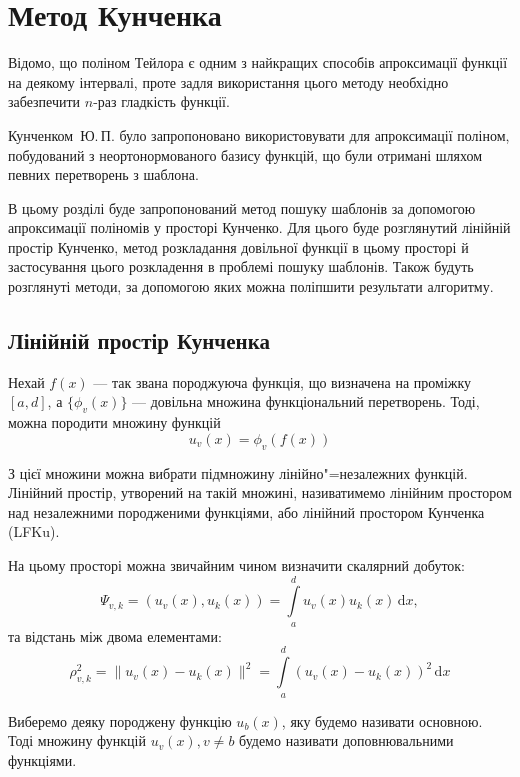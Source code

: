 \chapter{Метод Кунченка}
\label{chap:selected}

Відомо, що поліном Тейлора є одним з найкращих способів апроксимації функції на деякому інтервалі, проте задля
використання цього методу необхідно забезпечити $n$-раз гладкість функції.

Кунченком~Ю.\,П. було запропоновано використовувати для апроксимації поліном, побудований з неортонормованого базису
функцій, що були отримані шляхом певних перетворень з шаблона.

В цьому розділі буде запропонований метод пошуку шаблонів за допомогою апроксимації поліномів у просторі Кунченко.
Для цього буде розглянутий лінійній простір Кунченко, метод розкладання довільної функції в цьому просторі й
застосування цього розкладення в проблемі пошуку шаблонів.
Також будуть розглянуті методи, за допомогою яких можна поліпшити результати алгоритму.

\section{Лінійній простір Кунченка}
    Нехай $f(x)$ --- так звана породжуюча функція, що визначена на проміжку ${[a, d]}$, а $\{ \phi_v( x ) \}$ ---
    довільна множина функціональний перетворень.
    Тоді, можна породити множину функцій
    \begin{equation}
        u_v(x) = \phi_v( f( x ))
    \end{equation}

    З цієї множини можна вибрати підмножину лінійно"=незалежних функцій.
    Лінійний простір, утворений на такій множині, називатимемо лінійним простором над незалежними породженими
    функціями, або лінійний простором Кунченка (LFKu).

    На цьому просторі можна звичайним чином визначити скалярний добуток:
    \begin{equation}
        \Psi_{v,k} = (u_v( x ), u_k( x ) ) = \int\limits_a^d u_v( x ) u_k( x )\,\mathrm{d}x,
    \end{equation}
    та відстань між двома елементами:
    \begin{equation}
        \rho_{v,k}^2 = \|u_v( x ) - u_k( x )\|^2 = \int\limits_a^d\left(u_v(x) - u_k(x)\right)^2\,\mathrm{d}x
    \end{equation}

    Виберемо деяку породжену функцію $u_b(x)$, яку будемо називати основною.
    Тоді множину функцій $u_v(x), v \ne b$ будемо називати доповнювальними функціями.

